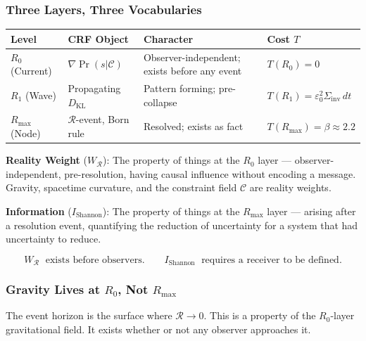 \documentclass[12pt, a4paper]{article}
\begin{document}
\subsubsection{Three Layers, Three Vocabularies}

\begin{formalbox}[title={DEF-RN02: Resolution Scale
($R_0$, $R_1$, $R_{\max}$)}]
\begin{center}
\renewcommand{\arraystretch}{1.35}
\begin{tabular}{p{2.0cm} p{3.8cm} p{3.8cm} p{3.0cm}}
\toprule
\textbf{Level} & \textbf{CRF Object} & \textbf{Character} &
\textbf{Cost $T$}\\
\midrule
$R_0$ (Current) & $\nabla\Pr(s|\mathcal{C})$ &
Observer-independent; exists before any event &
$T(R_0) = 0$\\[4pt]
$R_1$ (Wave) & Propagating $D_{\mathrm{KL}}$ &
Pattern forming; pre-collapse &
$T(R_1) = \varepsilon_0^2 \Sigma_{\mathrm{inv}}\,dt$\\[4pt]
$R_{\max}$ (Node) & $\mathcal{R}$-event, Born rule &
Resolved; exists as fact &
$T(R_{\max}) = \beta \approx 2.2$\\
\bottomrule
\end{tabular}
\end{center}
\end{formalbox}

\begin{formalbox}[title={DEF-RN03: Two modes of existence}]
\textbf{Reality Weight} ($W_{\mathcal{R}}$): The property of
things at the $R_0$ layer --- observer-independent, pre-resolution,
having causal influence without encoding a message. Gravity,
spacetime curvature, and the constraint field $\mathcal{C}$
are reality weights.

\medskip
\textbf{Information} ($I_{\mathrm{Shannon}}$): The property of
things at the $R_{\max}$ layer --- arising after a resolution event,
quantifying the reduction of uncertainty for a system that had
uncertainty to reduce.

\medskip
\[
W_{\mathcal{R}} \;\text{ exists before observers.}
\qquad
I_{\mathrm{Shannon}} \;\text{ requires a receiver to be defined.}
\]
\end{formalbox}

\subsubsection{Gravity Lives at $R_0$, Not $R_{\max}$}

The event horizon is the surface where $\mathcal{R} \to 0$. This is
a property of the $R_0$-layer gravitational field. It exists whether
or not any observer approaches it.
\end{document}
